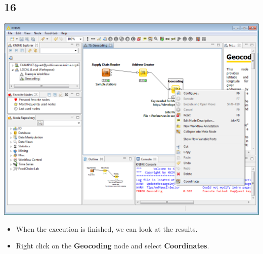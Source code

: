 \documentclass{beamer}
\begin{document}
\subsection{16}
\begin{frame}
	\begin{center}
  		\includegraphics[height=0.6\textheight]{16.png}
	\end{center}
	\begin{itemize}
		\item When the execution is finished, we can look at the results.
		\item Right click on the \textbf{Geocoding} node and select \textbf{Coordinates}.
	\end{itemize}
\end{frame}
\end{document}
